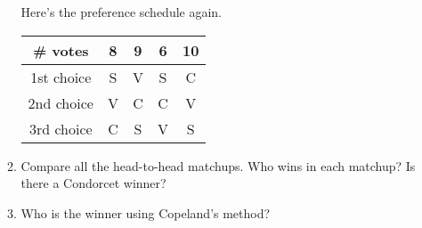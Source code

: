 \documentclass[12pt]{article}
\begin{document}
\begin{enumerate}
\begin{enumerate}
Here's the preference schedule again.

\begingroup %
\renewcommand{\arraystretch}{2} %
    \begin{tabular}{| c  | c | c  | c  | c |} \hline
    \# votes & 8&9&6&10\\ \hline \hline
1st choice & S& V& S & C\\ \hline
2nd choice &  V &C &  C&V\\ \hline
3rd choice & C & S& V  & S\\ \hline
\end{tabular}
\endgroup 

\item Compare all the head-to-head matchups. Who wins in each matchup? Is there a Condorcet winner?

\vfill

\item Who is the winner using Copeland's method?

\vfill


\end{enumerate}
\end{enumerate}
\end{document}
